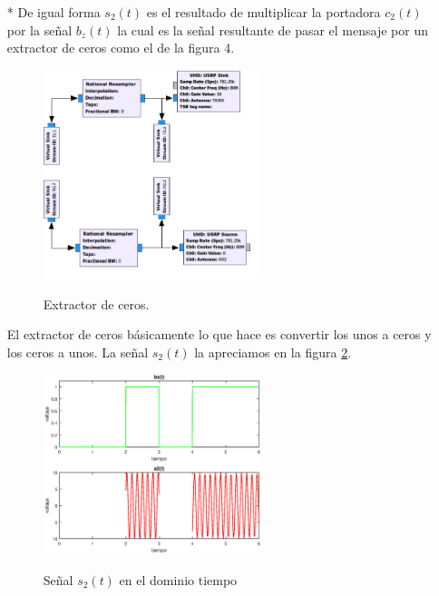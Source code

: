 \begin{itemize}
 \item[*]De igual forma $s_{2}(t)$ es el resultado de multiplicar la portadora $c_{2}(t)$ por la se\~nal $b_{z}(t)$ la cual es la se\~nal resultante de pasar el mensaje por un extractor de ceros como el de la figura 4. \\
 
 \vspace{200px}
 
  \begin{figure}[h!]
	\captionsetup{justification = raggedright, singlelinecheck = false}
    \caption{Extractor de ceros.}
    \centering
    \includegraphics[width=0.6\textwidth]{Imagenes/4.png}
    \label{fig:extractoceros}
\end{figure}
 
El extractor de ceros b\'asicamente lo que hace es convertir los unos a ceros y los ceros a unos. La se\~nal $s_{2}(t)$ la apreciamos en la figura \ref{fig:ejerciciosenals2}.
 
  \begin{figure}[h!]
	\captionsetup{justification = raggedright, singlelinecheck = false}
    \caption{Se\~nal $s_{2}(t)$ en el dominio tiempo }
    \centering
    \includegraphics[width=0.6\textwidth]{Imagenes/6.eps}
    \label{fig:ejerciciosenals2}
\end{figure}


\end{itemize}
